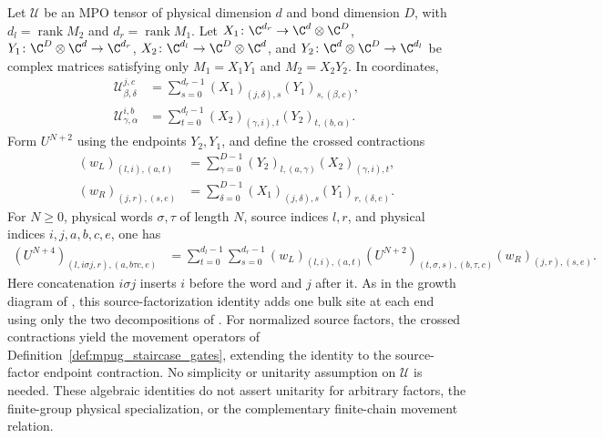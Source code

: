 \begin{lemma}
    \label{thm:mpug_truncated_symmetry_growth}
    \leanok
    Let $\mathcal U$ be an MPO tensor of physical dimension $d$ and bond
    dimension $D$, with $d_l=\operatorname{rank}M_2$ and
    $d_r=\operatorname{rank}M_1$. Let
    $X_1\colon\C^{d_r}\to\C^d\otimes\C^D$,
    $Y_1\colon\C^D\otimes\C^d\to\C^{d_r}$,
    $X_2\colon\C^{d_l}\to\C^D\otimes\C^d$, and
    $Y_2\colon\C^d\otimes\C^D\to\C^{d_l}$ be complex matrices
    satisfying only $M_1=X_1Y_1$ and $M_2=X_2Y_2$. In coordinates,
    \begin{align}
        \mathcal U^{j,c}_{\beta,\delta}
         & =\sum_{s=0}^{d_r-1}(X_1)_{(j,\delta),s}(Y_1)_{s,(\beta,c)},  \\
        \mathcal U^{i,b}_{\gamma,\alpha}
         & =\sum_{t=0}^{d_l-1}(X_2)_{(\gamma,i),t}(Y_2)_{t,(b,\alpha)}.
    \end{align}
    Form $U^{N+2}$ using the endpoints $Y_2,Y_1$, and define the crossed
    contractions
    \begin{align}
        (w_L)_{(l,i),(a,t)}
         & =\sum_{\gamma=0}^{D-1}(Y_2)_{l,(a,\gamma)}(X_2)_{(\gamma,i),t}, \\
        (w_R)_{(j,r),(s,e)}
         & =\sum_{\delta=0}^{D-1}(X_1)_{(j,\delta),s}(Y_1)_{r,(\delta,e)}.
    \end{align}
    For $N\geq0$, physical words $\sigma,\tau$ of length $N$, source
    indices $l,r$, and physical indices $i,j,a,b,c,e$, one has
    \begin{align}
        (U^{N+4})_{(l,i\sigma j,r),(a,b\tau c,e)}
         & =\sum_{t=0}^{d_l-1}\sum_{s=0}^{d_r-1}
        (w_L)_{(l,i),(a,t)}
        (U^{N+2})_{(t,\sigma,s),(b,\tau,c)}
        (w_R)_{(j,r),(s,e)}.
        \label{eq:mpug_truncated_symmetry_growth}
    \end{align}
    Here concatenation $i\sigma j$ inserts $i$ before the word and $j$ after
    it. As in the growth diagram of
    \cite[lines~2101--2174]{FrancoRubio2025MPUGauging}, this
    source-factorization identity adds one bulk site at each end using
    only the two decompositions of \cite[lines~479--530]{Cirac2017MPU}.
    For normalized source factors, the crossed contractions yield the
    movement operators of Definition~\ref{def:mpug_staircase_gates},
    extending the identity to the source-factor endpoint contraction.
    No simplicity or unitarity assumption on $\mathcal U$ is needed. These
    algebraic identities do not assert unitarity for arbitrary factors, the
    finite-group physical specialization, or the complementary finite-chain
    movement relation.
\end{lemma}
